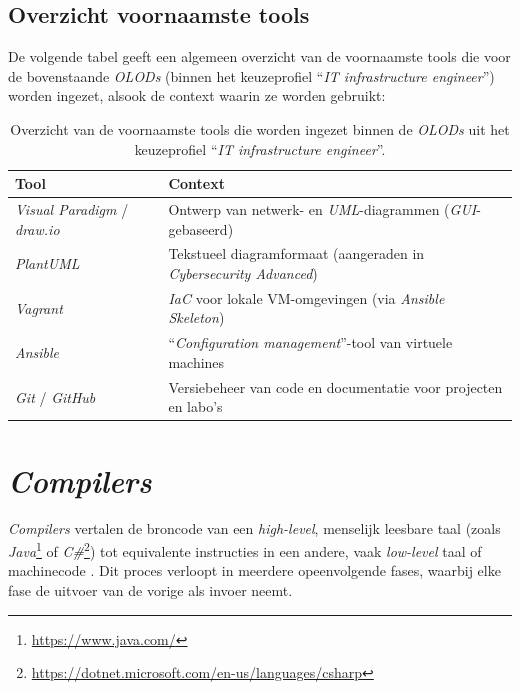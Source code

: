 \subsection{Overzicht voornaamste tools}%
\label{subsec:overzicht_tools}

De volgende tabel geeft een algemeen overzicht van de voornaamste tools die voor de bovenstaande \emph{OLODs} (binnen het keuzeprofiel ``\emph{IT infrastructure engineer}'') worden ingezet, alsook de context waarin ze worden gebruikt:

\begin{table}[H]
  \centering
  \begin{tabularx}{\textwidth}{l X}
    \toprule
    \textbf{Tool}                           & \textbf{Context}                                                       \\
    \midrule
    \emph{Visual Paradigm} / \emph{draw.io} & Ontwerp van netwerk- en \emph{UML}-diagrammen (\emph{GUI}-gebaseerd)   \\
    \emph{PlantUML}                         & Tekstueel diagramformaat (aangeraden in \emph{Cybersecurity Advanced}) \\
    \emph{Vagrant}                          & \emph{IaC} voor lokale VM-omgevingen (via \emph{Ansible Skeleton})     \\
    \emph{Ansible}                          & ``\emph{Configuration management}''-tool van virtuele machines         \\
    \emph{Git} / \emph{GitHub}              & Versiebeheer van code en documentatie voor projecten en labo's         \\
    \bottomrule
  \end{tabularx}
  \caption[Overzicht van voornaamste tools binnen keuzeprofiel ``\emph{IT infrastructure engineer}'']{Overzicht van de voornaamste tools die worden ingezet binnen de \emph{OLODs} uit het keuzeprofiel ``\emph{IT infrastructure engineer}''.}
  \label{tab:overzicht_tools}
\end{table}

\section{\emph{Compilers}}%
\label{sec:compilers}

\emph{Compilers} vertalen de broncode van een \emph{high-level}, menselijk leesbare taal (zoals \emph{Java}\footnote{\url{https://www.java.com/}} of \emph{C\#}\footnote{\url{https://dotnet.microsoft.com/en-us/languages/csharp}}) tot equivalente instructies in een andere, vaak \emph{low-level} taal of machinecode \autocite{Seidl2012}. Dit proces verloopt in meerdere opeenvolgende fases, waarbij elke fase de uitvoer van de vorige als invoer neemt.

